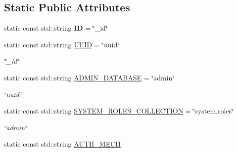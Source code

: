 \subsection*{Static Public Attributes}
\begin{DoxyCompactItemize}
\item 
\hypertarget{classrepo_1_1core_1_1handler_1_1_mongo_database_handler_ab55d3d2e445e6b56b8b2aeaefcf41c07}{}static const std\+::string {\bfseries I\+D} = \char`\"{}\+\_\+id\char`\"{}\label{classrepo_1_1core_1_1handler_1_1_mongo_database_handler_ab55d3d2e445e6b56b8b2aeaefcf41c07}

\item 
\hypertarget{classrepo_1_1core_1_1handler_1_1_mongo_database_handler_a75e5efc0b9ec2e40fa23bf46fd7af53b}{}static const std\+::string \hyperlink{classrepo_1_1core_1_1handler_1_1_mongo_database_handler_a75e5efc0b9ec2e40fa23bf46fd7af53b}{U\+U\+I\+D} = \char`\"{}uuid\char`\"{}\label{classrepo_1_1core_1_1handler_1_1_mongo_database_handler_a75e5efc0b9ec2e40fa23bf46fd7af53b}

\begin{DoxyCompactList}\small\item\em \char`\"{}\+\_\+id\char`\"{} \end{DoxyCompactList}\item 
\hypertarget{classrepo_1_1core_1_1handler_1_1_mongo_database_handler_a62321508d0b278c72036d7be7b138f9c}{}static const std\+::string \hyperlink{classrepo_1_1core_1_1handler_1_1_mongo_database_handler_a62321508d0b278c72036d7be7b138f9c}{A\+D\+M\+I\+N\+\_\+\+D\+A\+T\+A\+B\+A\+S\+E} = \char`\"{}admin\char`\"{}\label{classrepo_1_1core_1_1handler_1_1_mongo_database_handler_a62321508d0b278c72036d7be7b138f9c}

\begin{DoxyCompactList}\small\item\em \char`\"{}uuid\char`\"{} \end{DoxyCompactList}\item 
\hypertarget{classrepo_1_1core_1_1handler_1_1_mongo_database_handler_ada63d3d522b76c50732b17a461224c9a}{}static const std\+::string \hyperlink{classrepo_1_1core_1_1handler_1_1_mongo_database_handler_ada63d3d522b76c50732b17a461224c9a}{S\+Y\+S\+T\+E\+M\+\_\+\+R\+O\+L\+E\+S\+\_\+\+C\+O\+L\+L\+E\+C\+T\+I\+O\+N} = \char`\"{}system.\+roles\char`\"{}\label{classrepo_1_1core_1_1handler_1_1_mongo_database_handler_ada63d3d522b76c50732b17a461224c9a}

\begin{DoxyCompactList}\small\item\em \char`\"{}admin\char`\"{} \end{DoxyCompactList}\item 
\hypertarget{classrepo_1_1core_1_1handler_1_1_mongo_database_handler_a6a6c5aac7181c5190920fc7b4f250b97}{}static const std\+::string \hyperlink{classrepo_1_1core_1_1handler_1_1_mongo_database_handler_a6a6c5aac7181c5190920fc7b4f250b97}{A\+U\+T\+H\+\_\+\+M\+E\+C\+H}\label{classrepo_1_1core_1_1handler_1_1_mongo_database_handler_a6a6c5aac7181c5190920fc7b4f250b97}


\end{DoxyCompactItemize}
